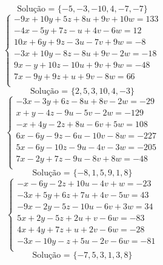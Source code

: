 \documentclass[12pt,oneside,a4paper]{article}
\begin{document}
\begin{equation*}
\text{Solução = }\{-5,-3,-10,4,-7,-7\}
\end{equation*}
\vspace{\baselineskip}
\begin{equation*}
\begin{cases}
-9x+10y+5z+8u+9v+10w=133 \\
-4x-5y+7z-u+4v-6w=12 \\
10x+6y+9z-3u-7v+9w=-8 \\
-3x+10y-8z-8u+9v-2w=-18 \\
9x-y+10z-10u+9v+9w=-48 \\
7x-9y+9z+u+9v-8w=66 \\
\end{cases}
\end{equation*}
\begin{equation*}
\text{Solução = }\{2,5,3,10,4,-3\}
\end{equation*}
\vspace{\baselineskip}
\begin{equation*}
\begin{cases}
-3x-3y+6z-8u+8v-2w=-29 \\
x+y-4z-9u-5v-2w=-129 \\
-x+4y-2z+8u-6v+5w=108 \\
6x-6y-9z-6u-10v-8w=-227 \\
5x-6y-10z-9u-4v-3w=-205 \\
7x-2y+7z-9u-8v+8w=-48 \\
\end{cases}
\end{equation*}
\begin{equation*}
\text{Solução = }\{-8,1,5,9,1,8\}
\end{equation*}
\vspace{\baselineskip}
\begin{equation*}
\begin{cases}
-x-6y-2z+10u-4v+w=-23 \\
-3x+5y+6z+7u+4v-5w=43 \\
-9x-2y-5z-10u-6v+3w=34 \\
5x+2y-5z+2u+v-6w=-83 \\
4x+4y+7z+u+2v-6w=-28 \\
-3x-10y-z+5u-2v-6w=-81 \\
\end{cases}
\end{equation*}
\begin{equation*}
\text{Solução = }\{-7,5,3,1,3,8\}
\end{equation*}
\end{document}
